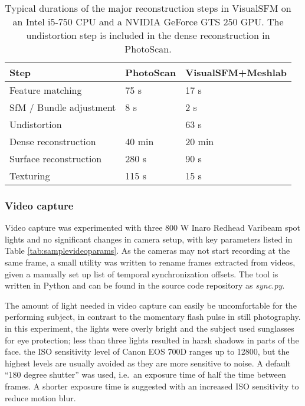 \begin{table}[h]
	\centering
	\begin{tabular}{l l l}
		Step & PhotoScan & VisualSFM+Meshlab \\ \hline
		Feature matching & 75 s & 17 s \\
		SfM / Bundle adjustment & 8 s & 2 s\\
		Undistortion & & 63 s\\
		Dense reconstruction & 40 min & 20 min\\
		Surface reconstruction & 280 s & 90 s\\
		Texturing & 115 s & 15 s\\
	\end{tabular}
	\caption{
		Typical durations of the major reconstruction steps in VisualSFM on an Intel i5-750 CPU and a NVIDIA GeForce GTS 250 GPU.
		The undistortion step is included in the dense reconstruction in PhotoScan.
	}
	\label{tab:reconsttime}
\end{table}

\afterpage{\clearpage}
\subsubsection{Video capture}

Video capture was experimented with three 800 W Inaro Redhead Varibeam spot lights and no significant changes in camera setup, with key parameters listed in Table \ref{tab:samplevideoparams}.
As the cameras may not start recording at the same frame, a small utility was written to rename frames extracted from videos, given a manually set up list of temporal synchronization offsets.
The tool is written in Python and can be found in the source code repository as \emph{sync.py}.

The amount of light needed in video capture can easily be uncomfortable for the performing subject, in contrast to the momentary flash pulse in still photography.
in this experiment, the lights were overly bright and the subject used sunglasses for eye protection; less than three lights resulted in harsh shadows in parts of the face.
the ISO sensitivity level of Canon EOS 700D ranges up to 12800, but the highest levels are usually avoided as they are more sensitive to noise.
A default ``180 degree shutter'' was used, i.e.\ an exposure time of half the time between frames.
A shorter exposure time is suggested with an increased ISO sensitivity to reduce motion blur.


